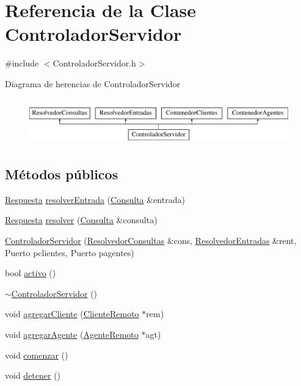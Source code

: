 \hypertarget{classControladorServidor}{\section{\-Referencia de la \-Clase \-Controlador\-Servidor}
\label{classControladorServidor}
}


{\ttfamily \#include $<$\-Controlador\-Servidor.\-h$>$}

\-Diagrama de herencias de \-Controlador\-Servidor\begin{figure}[H]
\begin{center}
\leavevmode
\includegraphics[height=2.000000cm]{classControladorServidor}
\end{center}
\end{figure}
\subsection*{\-Métodos públicos}
\begin{DoxyCompactItemize}
\item 
\hyperlink{classRespuesta}{\-Respuesta} \hyperlink{classControladorServidor_a45d1f810987e11a222986ecf588ac497}{resolver\-Entrada} (\hyperlink{classConsulta}{\-Consulta} \&entrada)
\item 
\hyperlink{classRespuesta}{\-Respuesta} \hyperlink{classControladorServidor_a1ca5d73913116531b23e8c998f51f18b}{resolver} (\hyperlink{classConsulta}{\-Consulta} \&consulta)
\item 
\hyperlink{classControladorServidor_a62668a91f2eeb6fe13d7a4079e023ac8}{\-Controlador\-Servidor} (\hyperlink{classResolvedorConsultas}{\-Resolvedor\-Consultas} \&cons, \hyperlink{classResolvedorEntradas}{\-Resolvedor\-Entradas} \&rent, \-Puerto pclientes, \-Puerto pagentes)
\item 
bool \hyperlink{classControladorServidor_a492e61d31b759540ec76a1ca2c7bb875}{activo} ()
\item 
\hyperlink{classControladorServidor_abe83c8c099a41bae0ff648e0b7281741}{$\sim$\-Controlador\-Servidor} ()
\item 
void \hyperlink{classControladorServidor_aaa97dc23fdf70cf91004bdb654b72585}{agregar\-Cliente} (\hyperlink{classClienteRemoto}{\-Cliente\-Remoto} $\ast$rem)
\item 
void \hyperlink{classControladorServidor_ad323cf3309ee0ddc8737c16a48432c28}{agregar\-Agente} (\hyperlink{classAgenteRemoto}{\-Agente\-Remoto} $\ast$agt)
\item 
void \hyperlink{classControladorServidor_aa50662d57613d4e161790f6e9dc1c299}{comenzar} ()
\item 
void \hyperlink{classControladorServidor_aa8f33c7beb356148089072234a2619b4}{detener} ()
\end{DoxyCompactItemize}


